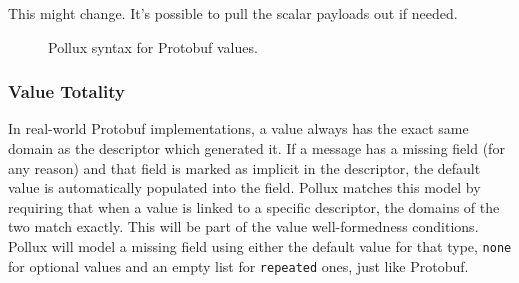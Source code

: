 {\color{red} This might change. It's possible to pull the scalar payloads out if
needed.}

\begin{figure}[h]
  \centering
  \begin{syntax}




    \categoryFromSet[32-bit Unsigned Integers]{\mathrm{u^{32}}}{[0, 2^{32})}

    \categoryFromSet[64-bit Unsigned Integers]{\mathrm{u^{64}}}{[0, 2^{64})}


    \alternative{\rept{[p_1; \dots; p_m]}}

    \alternative{\texttt{[]}}

  \end{syntax}
  \caption{Pollux syntax for Protobuf values.}\label{fig:proto-val-syn}
\end{figure}

\subsubsection{Value Totality}\label{sec:value-totality}

In real-world Protobuf implementations, a value always has the exact same domain
as the descriptor which generated it. If a message has a missing field (for any
reason) and that field is marked as implicit in the descriptor, the default
value is automatically populated into the field. Pollux matches this model by
requiring that when a value is linked to a specific descriptor, the domains of
the two match exactly. This will be part of the value well-formedness
conditions. Pollux will model a missing field using either the default value for
that type, \texttt{none} for optional values and an empty list for
\texttt{repeated} ones, just like Protobuf.

